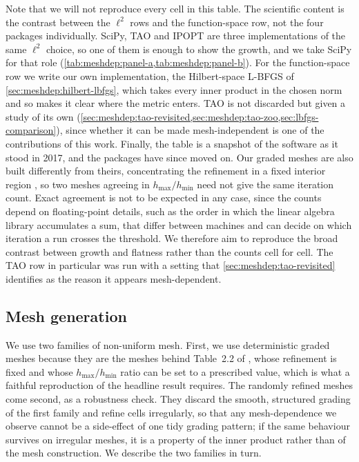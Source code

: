 \documentclass[a4paper,11pt]{article}
\theoremstyle{spacedplain} \newtheorem{theorem}[counter]{Theorem} \newtheorem{lemma}[counter]{Lemma} \newtheorem{prop}[counter]{Proposition} \newtheorem{cor}[counter]{Corollary}
\theoremstyle{spaceddefinition} \newtheorem{defn}[counter]{Definition} \newtheorem{example}[counter]{Example} \newtheorem{remark}[counter]{Remark}
\begin{document}
Note that we will not reproduce every cell in this table. The scientific content is the contrast between the $\ell^{2}$ rows and the function-space row, not the four packages individually. SciPy, TAO and IPOPT are three implementations of the same $\ell^{2}$ choice, so one of them is enough to show the growth, and we take SciPy for that role (\cref{tab:meshdep:panel-a,tab:meshdep:panel-b}). For the function-space row we write our own implementation, the Hilbert-space L-BFGS of \cref{sec:meshdep:hilbert-lbfgs}, which takes every inner product in the chosen norm and so makes it clear where the metric enters. TAO is not discarded but given a study of its own (\cref{sec:meshdep:tao-revisited,sec:meshdep:tao-zoo,sec:lbfgs-comparison}), since whether it can be made mesh-independent is one of the contributions of this work. Finally, the table is a snapshot of the software as it stood in 2017, and the packages have since moved on. Our graded meshes are also built differently from theirs, concentrating the refinement in a fixed interior region \citep[Sect.~2.3.1]{shfp2017}, so two meshes agreeing in $h_{\max} / h_{\min}$ need not give the same iteration count. Exact agreement is not to be expected in any case, since the counts depend on floating-point details, such as the order in which the linear algebra library accumulates a sum, that differ between machines and can decide on which iteration a run crosses the threshold. We therefore aim to reproduce the broad contrast between growth and flatness rather than the counts cell for cell. The TAO row in particular was run with a setting that \cref{sec:meshdep:tao-revisited} identifies as the reason it appears mesh-dependent.

\subsection{Mesh generation}
\label{sec:meshdep:meshes}

We use two families of non-uniform mesh. First, we use deterministic graded meshes because they are the meshes behind Table~2.2 of \citet{shfp2017}, whose refinement is fixed and whose $h_{\max}/h_{\min}$ ratio can be set to a prescribed value, which is what a faithful reproduction of the headline result requires. The randomly refined meshes come second, as a robustness check. They discard the smooth, structured grading of the first family and refine cells irregularly, so that any mesh-dependence we observe cannot be a side-effect of one tidy grading pattern; if the same behaviour survives on irregular meshes, it is a property of the inner product rather than of the mesh construction. We describe the two families in turn.
\end{document}
